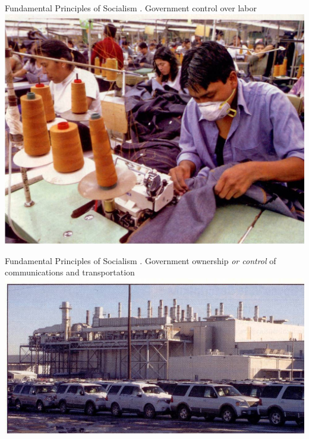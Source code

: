\begin{frame}{Fundamental Principles of Socialism}
    . Government control over labor \\
    \includegraphics[width=.9\textwidth]{img/labor.jpg} \\
\end{frame}

\begin{frame}{Fundamental Principles of Socialism}
    . Government ownership \emph{or control} of communications and transportation \\
    \includegraphics[width=.9\textwidth]{img/transportation.jpg} \\
\end{frame}

